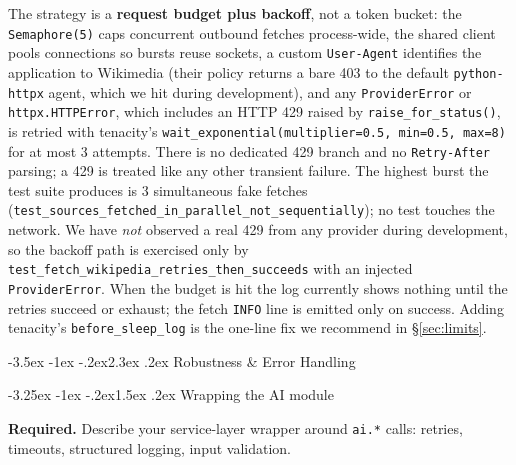 \documentclass[11pt,a4paper]{article}
\makeatletter
\renewcommand\section{\@startsection{section}{1}{\z@}%
    {-3.5ex \@plus -1ex \@minus -.2ex}{2.3ex \@plus .2ex}%
    {\normalfont\Large\bfseries\color{accent}}}%
\renewcommand\subsection{\@startsection{subsection}{2}{\z@}%
    {-3.25ex \@plus -1ex \@minus -.2ex}{1.5ex \@plus .2ex}%
    {\normalfont\large\bfseries\color{accent}}}%
\makeatother
\begin{document}
The strategy is a \textbf{request budget plus backoff}, not a token bucket: the \texttt{Semaphore(5)} caps concurrent outbound fetches process-wide, the shared client pools connections so bursts reuse sockets, a custom \texttt{User-Agent} identifies the application to Wikimedia (their policy returns a bare 403 to the default \texttt{python-httpx} agent, which we hit during development), and any \texttt{ProviderError} or \texttt{httpx.HTTPError}, which includes an HTTP 429 raised by \texttt{raise\_for\_status()}, is retried with tenacity's \texttt{wait\_exponential(multiplier=0.5, min=0.5, max=8)} for at most 3 attempts. There is no dedicated 429 branch and no \texttt{Retry-After} parsing; a 429 is treated like any other transient failure. The highest burst the test suite produces is 3 simultaneous fake fetches (\texttt{test\_sources\_fetched\_in\_parallel\_not\_sequentially}); no test touches the network. We have \emph{not} observed a real 429 from any provider during development, so the backoff path is exercised only by \texttt{test\_fetch\_wikipedia\_retries\_then\_succeeds} with an injected \texttt{ProviderError}. When the budget is hit the log currently shows nothing until the retries succeed or exhaust; the fetch \texttt{INFO} line is emitted only on success. Adding tenacity's \texttt{before\_sleep\_log} is the one-line fix we recommend in \S\ref{sec:limits}.

\section{Robustness \& Error Handling}\label{sec:robustness}

\subsection{Wrapping the AI module}

\begin{deliverbox}
\textbf{Required.} Describe your service-layer wrapper around \texttt{ai.*} calls: retries, timeouts, structured logging, input validation.
\end{deliverbox}
\end{document}
